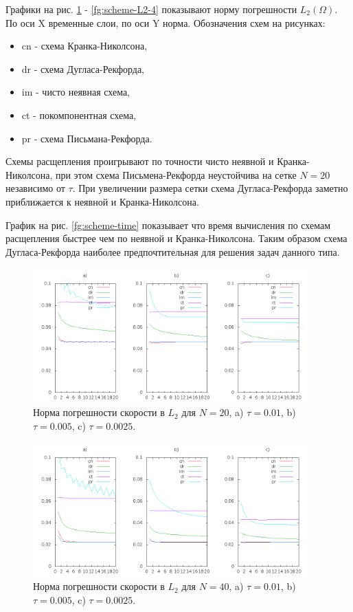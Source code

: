 \documentclass[12pt]{article}
\begin{document}
Графики на рис. \ref{fg:scheme-L2-1} - \ref{fg:scheme-L2-4} показывают норму погрешности $L_2(\Omega)$. По оси X временные слои, по оси Y норма. Обозначения схем на рисунках:
\begin{itemize}
\item cn - схема Кранка-Николсона,
\item dr - схема Дугласа-Рекфорда,
\item im - чисто неявная схема,
\item ct - покомпонентная схема,
\item pr - схема Письмана-Рекфорда.
\end{itemize}
Схемы расщепления проигрывают по точности чисто неявной и Кранка-Николсона, при этом  схема Письмена-Рекфорда неустойчива на сетке $N=20$ независимо от $\tau$. При увеличении размера сетки схема Дугласа-Рекфорда заметно приближается к неявной и Кранка-Николсона.

График на рис. \ref{fg:scheme-time} показывает что время вычисления по схемам расщепления быстрее чем по неявной и Кранка-Николсона. Таким образом схема Дугласа-Рекфорда наиболее предпочтительная для решения задач данного типа.

\begin{figure}
	\begin{center}
		\includegraphics[width=400px]{data160/error_1}
		\caption{Норма погрешности скорости в $L_2$ для $N=20$, a) $\tau=0.01$, b) $\tau=0.005$, c) $\tau=0.0025$.}
		\label{fg:scheme-L2-1}
	\end{center}
\end{figure}

\begin{figure}
	\begin{center}
		\includegraphics[width=400px]{data160/error_2}
		\caption{Норма погрешности скорости в $L_2$ для $N=40$, a) $\tau=0.01$, b) $\tau=0.005$, c) $\tau=0.0025$.}
		\label{fg:scheme-L2-2}
	\end{center}
\end{figure}
\end{document}
